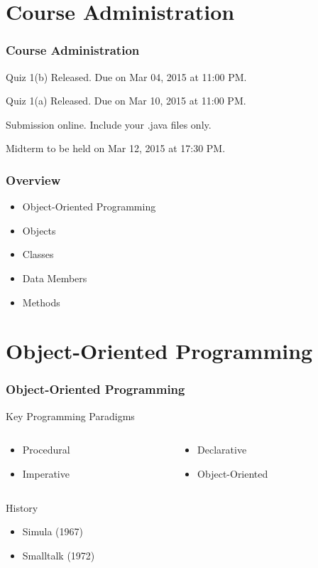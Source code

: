 \documentclass[10pt, compress]{beamer}
\begin{document}
\prepareCover

\section{Course Administration}

\begin{frame}[fragile]
\frametitle{Course Administration}
Quiz 1(b) Released. Due on Mar 04, 2015 at 11:00 PM.

Quiz 1(a) Released. Due on Mar 10, 2015 at 11:00 PM.

Submission online. Include your .java files only.

Midterm to be held on Mar 12, 2015 at 17:30 PM.
\end{frame}

\begin{frame}[fragile]
	\frametitle{Overview}
	\begin{itemize}
		\item[] Object-Oriented Programming
		\item[] Objects
		\item[] Classes
		\item[] Data Members
		\item[] Methods
	\end{itemize}
\end{frame}

\section{Object-Oriented Programming}

\begin{frame}[fragile]
	\frametitle{Object-Oriented Programming}
	\begin{block}{Key Programming Paradigms}
		\begin{columns}
			\begin{column}{0.5\textwidth}
				\begin{itemize}
					\item[] Procedural
					\item[] Imperative
				\end{itemize}
			\end{column}
			\begin{column}{0.5\textwidth}
				\begin{itemize}
					\item[] Declarative
					\item[] Object-Oriented
				\end{itemize}
			\end{column}
		\end{columns}
	\end{block}
	\begin{block}{History}
		\begin{itemize}
			\item[] Simula (1967)
			\item[] Smalltalk (1972)
		\end{itemize}
	\end{block}
\end{frame}
\end{document}
